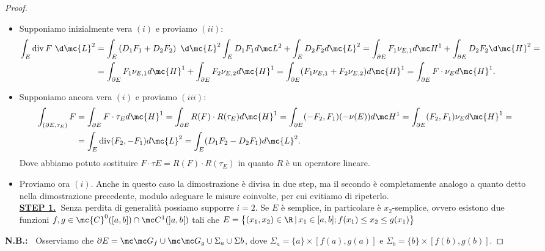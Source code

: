 \begin{proof}
   \begin{itemize}
    \item Supponiamo inizialmente vera $(i)$ e proviamo $(ii)$:
    \[\begin{aligned}
        \int_E \operatorname{div} F\ \d \mc{L}^{2} &= \int_E \left(D_1 F_1 + D_2 F_2\right)\ \d \mc{L}^{2} \int_E D_1F_1d\mc L^2 +\int_E D_2F_2 d\mc{L}^2 = \int_{\partial E} F_1\nu_{E,1}d\mc H^1 + \int_{\partial E}D_2F_2\d \mc{H}^2 = \\ &= \int_{\partial E} F_1 \nu_{E,1}d\mc{H}^1 + \int_{\partial E} F_2\nu_{E,2}d\mc{H}^1 = \int_{\partial E }(F_1\nu_{E,1} + F_2\nu_{E,2})d\mc{H}^1 = \int_{\partial E} F\cdot \nu_{E}d\mc{H}^1.
    \end{aligned}\]
    \item Supponiamo ancora vera $(i)$ e proviamo $(iii)$:
    \[\begin{aligned}
        \int_{(\partial E, \tau_E)} F &= \int_{\partial E}F\cdot \tau_Ed\mc{H}^1 = \int_{\partial E} R(F)\cdot R(\tau_E)d\mc{H}^1 = \int_{\partial E}(-F_2,F_1)(-\nu(E))d\mc H^1 = \int_{\partial E}(F_2,F_1)\nu_Ed\mc{H}^1 =\\ &= \int_E \operatorname{div} (F_2,-F_1)d\mc{L}^2 = \int_E (D_1F_2 - D_2F_1)d\mc{L}^2.
    \end{aligned}\]
    Dove abbiamo potuto sostituire $F\cdot \tau E = R(F)\cdot R(\tau_E)$ in quanto $R$ è un operatore lineare.
    \item Proviamo ora $(i)$. Anche in questo caso la dimostrazione è divisa in due step, ma il secondo è completamente analogo a quanto detto nella dimostrazione precedente, modulo adeguare le misure coinvolte, per cui evitiamo di ripeterlo.\\
    \textbf{\underline{STEP 1.}\ }Senza perdita di generalità possiamo supporre $i=2$. Se $E$ è semplice, in particolare è $x_2$-semplice, ovvero esistono due funzioni $f,g\in \mc{C}^0([a,b])\cap\mc C^1(]a,b[)$ tali che $E=\bigl\{(x_1,x_2)\in\R\,|\,x_1\in [a,b]; f(x_1)\leq x_2\leq g(x_1)\bigr\}$
    \begin{center}
        
    \end{center} 
   \end{itemize} 
   \textbf{N.B.:\ } Osserviamo che $\partial E = \mc \mc G_f\cup \mc \mc G_g \cup \Sigma_a \cup \Sigma b$, dove $\Sigma_a = \{a\}\times [f(a),g(a)]$ e $\Sigma_b = \{b\}\times [f(b),g(b)]$.


\end{proof}
